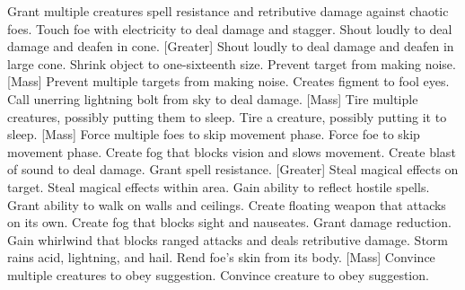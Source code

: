     {Grant multiple creatures spell resistance and retributive damage against chaotic foes.}
    {Touch foe with electricity to deal damage and stagger.}
    {Shout loudly to deal damage and deafen in cone.}
[Greater]
    {Shout loudly to deal damage and deafen in large cone.}
    {Shrink object to one-sixteenth size.}
    {Prevent target from making noise.}
[Mass]
    {Prevent multiple targets from making noise.}
    {Creates figment to fool eyes.}
    {Call unerring lightning bolt from sky to deal damage.}
[Mass]
    {Tire multiple creatures, possibly putting them to sleep.}
    {Tire a creature, possibly putting it to sleep.}
[Mass]
    {Force multiple foes to skip movement phase.}
    {Force foe to skip movement phase.}
    {Create fog that blocks vision and slows movement.}
    {Create blast of sound to deal damage.}
    {Grant spell resistance.}
[Greater]
    {Steal magical effects on target.}
    {Steal magical effects within area.}
    {Gain ability to reflect hostile spells.}
    {Grant ability to walk on walls and ceilings.}
    {Create floating weapon that attacks on its own.}
    {Create fog that blocks sight and nauseates.}
    {Grant damage reduction.}
    {Gain whirlwind that blocks ranged attacks and deals retributive damage.}
    {Storm rains acid, lightning, and hail.}
    {Rend foe's skin from its body.}
[Mass]
    {Convince multiple creatures to obey suggestion.}
    {Convince creature to obey suggestion.}
